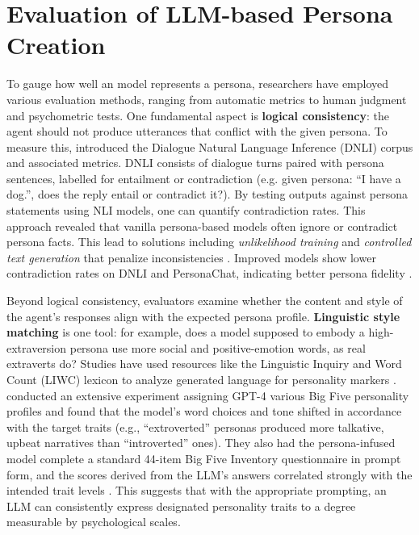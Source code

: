 \section{Evaluation of LLM-based Persona Creation}
To gauge how well an model represents a persona, researchers have employed various evaluation methods, ranging from automatic metrics to human judgment and psychometric tests. One fundamental aspect is \textbf{logical consistency}: the agent should not produce utterances that conflict with the given persona. To measure this, \cite{welleck-etal-2019-dialogueNLI} introduced the Dialogue Natural Language Inference (DNLI) corpus and associated metrics. DNLI consists of dialogue turns paired with persona sentences, labelled for entailment or contradiction (e.g. given persona: ``I have a dog.'', does the reply entail or contradict it?). By testing outputs against persona statements using NLI models, one can quantify contradiction rates. This approach revealed that vanilla persona-based models often ignore or contradict persona facts.   This lead to solutions including \emph{unlikelihood training}  and \emph{controlled text generation} that penalize inconsistencies \cite{li-etal-2020-dont, kim-etal-2020-will}. Improved models show lower contradiction rates on DNLI and PersonaChat, indicating better persona fidelity \cite{kim-etal-2020-will}.

Beyond logical consistency, evaluators examine whether the content and style of the agent's responses align with the expected persona profile. \textbf{Linguistic style matching} is one tool: for example, does a model supposed to embody a high-extraversion persona use more social and positive-emotion words, as real extraverts do? Studies have used resources like the Linguistic Inquiry and Word Count (LIWC) lexicon to analyze generated language for personality markers \cite{jiang-etal-2023-personallm}. \cite{jiang-etal-2023-personallm} conducted an extensive experiment assigning GPT-4 various Big Five personality profiles and found that the model's word choices and tone shifted in accordance with the target traits (e.g., ``extroverted'' personas produced more talkative, upbeat narratives than ``introverted'' ones). They also had the persona-infused model complete a standard 44-item Big Five Inventory questionnaire in prompt form, and the scores derived from the LLM's answers correlated strongly with the intended trait levels \cite{jiang-etal-2023-personallm}. This suggests that with the appropriate prompting, an LLM can consistently express designated personality traits to a degree measurable by psychological scales.

